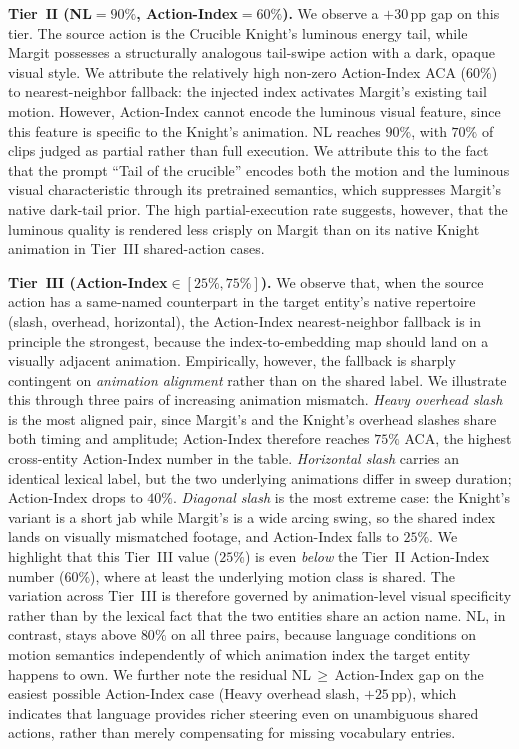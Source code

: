 \textbf{Tier~$\mathbf{II}$ (NL$=90\%$, Action-Index$=60\%$).}
We observe a $+30$\,pp gap on this tier. The source action is the Crucible Knight's luminous energy tail, while Margit possesses a structurally analogous tail-swipe action with a dark, opaque visual style. We attribute the relatively high non-zero Action-Index ACA ($60\%$) to nearest-neighbor fallback: the injected index activates Margit's existing tail motion. However, Action-Index cannot encode the luminous visual feature, since this feature is specific to the Knight's animation. NL reaches $90\%$, with $70\%$ of clips judged as partial rather than full execution. We attribute this to the fact that the prompt ``Tail of the crucible'' encodes both the motion and the luminous visual characteristic through its pretrained semantics, which suppresses Margit's native dark-tail prior. The high partial-execution rate suggests, however, that the luminous quality is rendered less crisply on Margit than on its native Knight animation in Tier~III shared-action cases.

\textbf{Tier~$\mathbf{III}$ (Action-Index$\in [25\%, 75\%]$).}
We observe that, when the source action has a same-named counterpart in the target entity's native repertoire (slash, overhead, horizontal), the Action-Index nearest-neighbor fallback is in principle the strongest, because the index-to-embedding map should land on a visually adjacent animation. Empirically, however, the fallback is sharply contingent on \emph{animation alignment} rather than on the shared label.
We illustrate this through three pairs of increasing animation mismatch.
\textit{Heavy overhead slash} is the most aligned pair, since Margit's and the Knight's overhead slashes share both timing and amplitude; Action-Index therefore reaches $75\%$ ACA, the highest cross-entity Action-Index number in the table.
\textit{Horizontal slash} carries an identical lexical label, but the two underlying animations differ in sweep duration; Action-Index drops to $40\%$.
\textit{Diagonal slash} is the most extreme case: the Knight's variant is a short jab while Margit's is a wide arcing swing, so the shared index lands on visually mismatched footage, and Action-Index falls to $25\%$. We highlight that this Tier~III value ($25\%$) is even \emph{below} the Tier~II Action-Index number ($60\%$), where at least the underlying motion class is shared. The variation across Tier~III is therefore governed by animation-level visual specificity rather than by the lexical fact that the two entities share an action name. NL, in contrast, stays above $80\%$ on all three pairs, because language conditions on motion semantics independently of which animation index the target entity happens to own. We further note the residual NL\,$\geq$\,Action-Index gap on the easiest possible Action-Index case (Heavy overhead slash, $+25$\,pp), which indicates that language provides richer steering even on unambiguous shared actions, rather than merely compensating for missing vocabulary entries.

